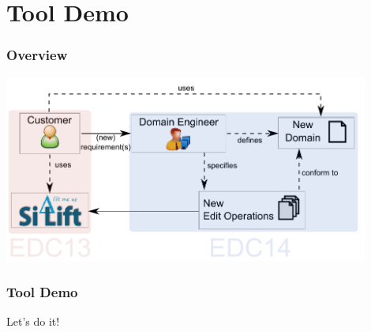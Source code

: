 \section{Tool Demo}
\begin{frame}
\frametitle{Overview}
  \begin{center}
\includegraphics[width=0.9\textwidth]{images/overview3}
  \end{center}
\end{frame}
\begin{frame}
\frametitle{Tool Demo}
\centering
{\LARGE{Let's do it!}}
\end{frame}